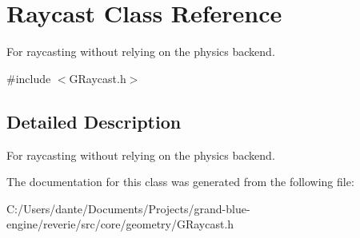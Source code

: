 \hypertarget{class_raycast}{}\section{Raycast Class Reference}
\label{class_raycast}


For raycasting without relying on the physics backend.  




{\ttfamily \#include $<$G\+Raycast.\+h$>$}



\subsection{Detailed Description}
For raycasting without relying on the physics backend. 

The documentation for this class was generated from the following file\+:\begin{DoxyCompactItemize}
\item 
C\+:/\+Users/dante/\+Documents/\+Projects/grand-\/blue-\/engine/reverie/src/core/geometry/G\+Raycast.\+h\end{DoxyCompactItemize}
